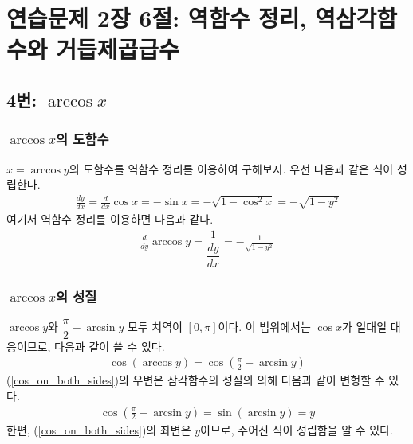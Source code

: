 \section{연습문제 2장 6절: 역함수 정리, 역삼각함수와 거듭제곱급수}
\subsection{4번: $\arccos x$}
\subsubsection{$\arccos x$의 도함수}
$x=\arccos y$의 도함수를 역함수 정리를 이용하여 구해보자. 우선 다음과 같은 식이 성립한다.
\begin{align}
\frac{dy}{dx}=\frac{d}{dx}\cos x=-\sin x=-\sqrt{1-\cos^2 x}=-\sqrt{1-y^2}
\end{align}
여기서 역함수 정리를 이용하면 다음과 같다.
\begin{align}
\frac{d}{dy}\arccos y=\dfrac{1}{\dfrac{dy}{dx}}=-\frac{1}{\sqrt{1-y^2}}
\end{align}

\subsubsection{$\arccos x$의 성질}
$\arccos y$와 $\dfrac{\pi}{2}-\arcsin y$ 모두 치역이 $[0, \pi]$이다. 이 범위에서는 $\cos x$가 일대일 대응이므로, 다음과 같이 쓸 수 있다.
\begin{align}\label{cos_on_both_sides}
\cos(\arccos y)=\cos\left(\frac{\pi}{2}-\arcsin y\right)
\end{align}
(\ref{cos_on_both_sides})의 우변은 삼각함수의 성질의 의해 다음과 같이 변형할 수 있다.
\begin{align}
\cos\left(\frac{\pi}{2}-\arcsin y\right)=\sin(\arcsin y)=y
\end{align}
한편, (\ref{cos_on_both_sides})의 좌변은 $y$이므로, 주어진 식이 성립함을 알 수 있다. 
